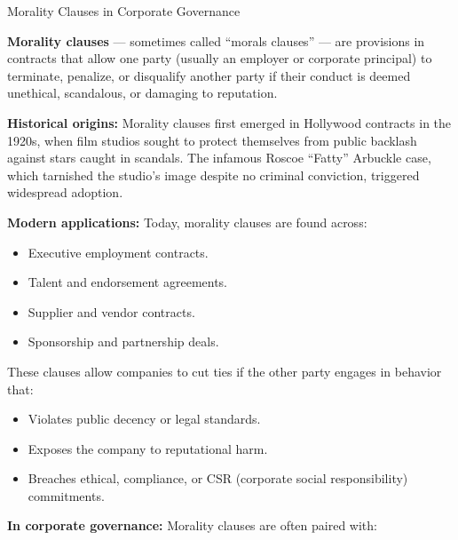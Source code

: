 \begin{HistoricalSidebar}{Morality Clauses in Corporate Governance}

    \textbf{Morality clauses} — sometimes called “morals clauses” — are provisions in contracts that allow one party (usually an employer or corporate principal) to terminate, penalize, or disqualify another party if their conduct is deemed unethical, scandalous, or damaging to reputation.
    
    \medskip
    
    \textbf{Historical origins:}
    Morality clauses first emerged in Hollywood contracts in the 1920s, when film studios sought to protect themselves from public backlash against stars caught in scandals. The infamous Roscoe “Fatty” Arbuckle case, which tarnished the studio’s image despite no criminal conviction, triggered widespread adoption.
    
    \medskip
    
    \textbf{Modern applications:} Today, morality clauses are found across:

    \medskip

    \begin{itemize}
        \item Executive employment contracts.
        \item Talent and endorsement agreements.
        \item Supplier and vendor contracts.
        \item Sponsorship and partnership deals.
    \end{itemize}
    
    \medskip
    
    These clauses allow companies to cut ties if the other party engages in behavior that:

    \medskip

    \begin{itemize}
        \item Violates public decency or legal standards.
        \item Exposes the company to reputational harm.
        \item Breaches ethical, compliance, or CSR (corporate social responsibility) commitments.
    \end{itemize}
    
    \medskip
    
    \textbf{In corporate governance:} Morality clauses are often paired with:

    \medskip


\end{HistoricalSidebar}
